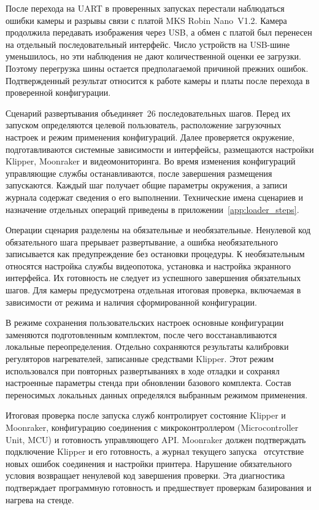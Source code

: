 После перехода на UART в проверенных запусках перестали наблюдаться ошибки камеры и разрывы связи с платой MKS Robin Nano~V1.2. Камера продолжила передавать изображения через USB, а обмен с платой был перенесен на отдельный последовательный интерфейс. Число устройств на USB-шине уменьшилось, но эти наблюдения не дают количественной оценки ее загрузки. Поэтому перегрузка шины остается предполагаемой причиной прежних ошибок. Подтвержденный результат относится к работе камеры и платы после перехода в проверенной конфигурации.

Сценарий развертывания объединяет~26 последовательных шагов. Перед их запуском определяются целевой пользователь, расположение загрузочных настроек и режим применения конфигураций. Далее проверяется окружение, подготавливаются системные зависимости и интерфейсы, размещаются настройки Klipper, Moonraker и видеомониторинга. Во время изменения конфигураций управляющие службы останавливаются, после завершения размещения~\textemdash{} запускаются. Каждый шаг получает общие параметры окружения, а записи журнала содержат сведения о его выполнении. Технические имена сценариев и назначение отдельных операций приведены в приложении~\ref{app:loader_steps}.

Операции сценария разделены на обязательные и необязательные. Ненулевой код обязательного шага прерывает развертывание, а ошибка необязательного записывается как предупреждение без остановки процедуры. К необязательным относятся настройка службы видеопотока, установка и настройка экранного интерфейса. Их готовность не следует из успешного завершения обязательных шагов. Для камеры предусмотрена отдельная итоговая проверка, включаемая в зависимости от режима и наличия сформированной конфигурации.

В режиме сохранения пользовательских настроек основные конфигурации заменяются подготовленным комплектом, после чего восстанавливаются локальные переопределения. Отдельно сохраняются результаты калибровки регуляторов нагревателей, записанные средствами Klipper. Этот режим использовался при повторных развертываниях в ходе отладки и сохранял настроенные параметры стенда при обновлении базового комплекта. Состав переносимых локальных данных определялся выбранным режимом применения.

Итоговая проверка после запуска служб контролирует состояние Klipper и Moonraker, конфигурацию соединения с микроконтроллером (Microcontroller Unit, MCU) и готовность управляющего API. Moonraker должен подтверждать подключение Klipper и его готовность, а журнал текущего запуска~\textemdash{} отсутствие новых ошибок соединения и настройки принтера. Нарушение обязательного условия возвращает ненулевой код завершения проверки. Эта диагностика подтверждает программную готовность и предшествует проверкам базирования и нагрева на стенде.

